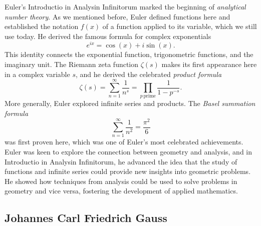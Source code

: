 Euler's Introductio in Analysin Infinitorum marked the beginning of \emph{analytical number theory}. As we mentioned before, Euler defined functions here and established the notation $f(x)$ of a function applied to its variable, which we still use today. He derived the famous formula for complex exponentials
\begin{equation*}
  e^{ix}=\cos(x) + i \sin(x).
\end{equation*}
This identity connects the exponential function, trigonometric functions, and the imaginary unit. The Riemann zeta function $\zeta(s)$ makes its first appearance here in a complex variable $s$, and he derived the celebrated \emph{product formula}
\begin{equation*}
  \zeta(s)=\sum_{n=1}^{\infty}\frac{1}{n^s}=\prod_{p\,\mathrm{prime}}\frac{1}{1-p^{-s}}.
\end{equation*}
More generally, Euler explored infinite series and products. The \emph{Basel summation formula}
\begin{equation*}
  \sum_{n=1}^\infty \frac{1}{n^2}=\frac{\pi^2}{6}
\end{equation*}
was first proven here, which was one of Euler's most celebrated achievements. Euler was keen to explore the connection between geometry and analysis, and in Introductio in Analysin Infinitorum, he advanced the idea that the study of functions and infinite series could provide new insights into geometric problems. He showed how techniques from analysis could be used to solve problems in geometry and vice versa, fostering the development of applied mathematics.

\subsection{Johannes Carl Friedrich Gauss}

